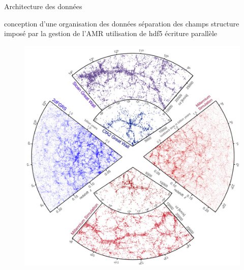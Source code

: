 Architecture des données 

conception d'une organisation des données
séparation des champs
structure imposé par la gestion de l'AMR
utilisation de hdf5
écriture parallèle

%




\begin{figure}[bth]
        \includegraphics[width=.95\linewidth]{img/02/sdss_millenium.jpeg} 
        \caption{ 
}
 		\label{fig:}
\end{figure}

